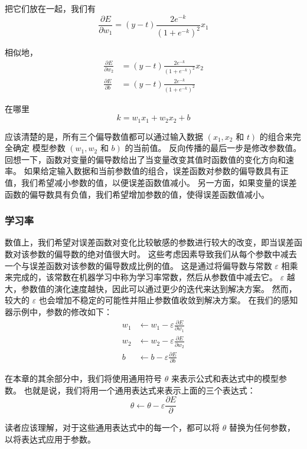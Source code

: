 把它们放在一起，我们有
$$
\frac{\partial E}{\partial w_{1}}=(y-t) \frac{2 e^{-k}}{\left(1+e^{-k}\right)^{2}} x_{1}
$$

相似地，
$$
\begin{aligned}
\frac{\partial E}{\partial w_{2}} & =(y-t) \frac{2 e^{-k}}{\left(1+e^{-k}\right)^{2} } x_{2} \\
\frac{\partial E}{\partial b} & =(y-t) \frac{2 e^{-k}}{\left(1+e^{-k}\right)^{2}}
\end{aligned}
$$

在哪里
$$
k=w_{1} x_{1}+w_{2} x_{2}+b
$$

应该清楚的是，所有三个偏导数值都可以通过输入数据 $\left(x_{1}, x_{2}\right.$ 
和 $\left.t\right)$ 的组合来完全确定 模型参数 $\left(w_{1}, w_{2}\right.$ 和 $\left.b\right)$ 的当前值。 
反向传播的最后一步是修改参数值。 回想一下，函数对变量的偏导数给出了当变量改变其值时函数值的变化方向和速率。 
如果给定输入数据和当前参数值的组合，误差函数对参数的偏导数具有正值，我们希望减小参数的值，以便误差函数值减小。 
另一方面，如果变量的误差函数的偏导数具有负值，我们希望增加参数的值，使得误差函数值减小。

\subsubsection{学习率}
数值上，我们希望对误差函数对变化比较敏感的参数进行较大的改变，即当误差函数对该参数的偏导数的绝对值很大时。 
这些考虑因素导致我们从每个参数中减去一个与误差函数对该参数的偏导数成比例的值。 
这是通过将偏导数与常数 $\varepsilon$ 相乘来完成的，该常数在机器学习中称为学习率常数，然后从参数值中减去它。 
$\varepsilon$ 越大，参数值的演化速度越快，因此可以通过更少的迭代来达到解决方案。 
然而，较大的 $\varepsilon$ 也会增加不稳定的可能性并阻止参数值收敛到解决方案。 在我们的感知器示例中，参数的修改如下：
$$
\begin{aligned}
w_{1} & \leftarrow w_{1}-\varepsilon \frac{\partial E}{\partial w_{1}} \\
w_{2} & \leftarrow w_{2}-\varepsilon \frac{\partial E}{\partial w_{2}} \\
b & \leftarrow b-\varepsilon \frac{\partial E}{\partial b}
\end{aligned}
$$

在本章的其余部分中，我们将使用通用符号 $\theta$ 来表示公式和表达式中的模型参数。 
也就是说，我们将用一个通用表达式来表示上面的三个表达式：
$$
\theta \leftarrow \theta-\varepsilon \frac{\partial E}{\partial}
$$

读者应该理解，对于这些通用表达式中的每一个，都可以将 $\theta$ 替换为任何参数，以将表达式应用于参数。

